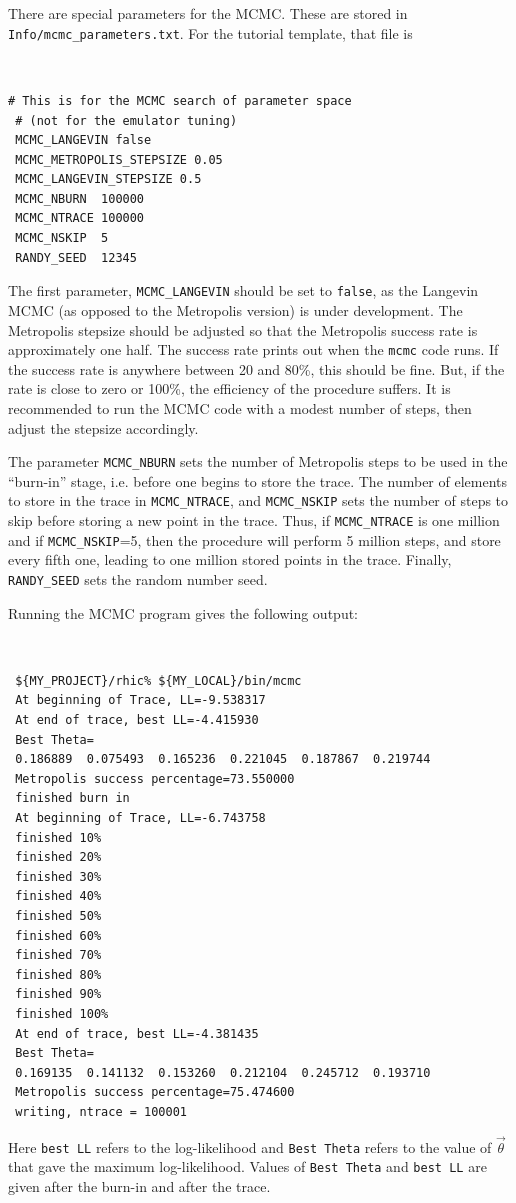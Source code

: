 \documentclass[UserManual.tex]{subfiles}
\begin{document}
There are special parameters for the MCMC. These are stored in {\tt Info/mcmc\_parameters.txt}. For the tutorial template, that file is
{\tt
\begin{verbatim}
# This is for the MCMC search of parameter space
 # (not for the emulator tuning)
 MCMC_LANGEVIN false
 MCMC_METROPOLIS_STEPSIZE 0.05
 MCMC_LANGEVIN_STEPSIZE 0.5
 MCMC_NBURN  100000
 MCMC_NTRACE 100000
 MCMC_NSKIP  5
 RANDY_SEED  12345
\end{verbatim}}
The first parameter, {\tt MCMC\_LANGEVIN} should be set to {\tt false}, as the Langevin MCMC (as opposed to the Metropolis version) is under development. The Metropolis stepsize should be adjusted so that the Metropolis success rate is approximately one half. The success rate prints out when the {\tt mcmc} code runs. If the success rate is anywhere between 20 and 80\%, this should be fine. But, if the rate is close to zero or 100\%, the efficiency of the procedure suffers. It is recommended to run the MCMC code with a modest number of steps, then adjust the stepsize accordingly.

The parameter {\tt MCMC\_NBURN} sets the number of Metropolis steps to be used in the ``burn-in'' stage, i.e. before one begins to store the trace. The number of elements to store in the trace in {\tt MCMC\_NTRACE}, and {\tt MCMC\_NSKIP} sets the number of steps to skip before storing a new point in the trace. Thus, if {\tt MCMC\_NTRACE} is one million and if {\tt MCMC\_NSKIP}=5, then the procedure will perform 5 million steps, and store every fifth one, leading to one million stored points in the trace. Finally, {\tt RANDY\_SEED} sets the random number seed. 

Running the MCMC program gives the following output:
{\tt
\begin{verbatim}
 ${MY_PROJECT}/rhic% ${MY_LOCAL}/bin/mcmc
 At beginning of Trace, LL=-9.538317
 At end of trace, best LL=-4.415930
 Best Theta=
 0.186889  0.075493  0.165236  0.221045  0.187867  0.219744
 Metropolis success percentage=73.550000
 finished burn in
 At beginning of Trace, LL=-6.743758
 finished 10%
 finished 20%
 finished 30%
 finished 40%
 finished 50%
 finished 60%
 finished 70%
 finished 80%
 finished 90%
 finished 100%
 At end of trace, best LL=-4.381435
 Best Theta=
 0.169135  0.141132  0.153260  0.212104  0.245712  0.193710
 Metropolis success percentage=75.474600
 writing, ntrace = 100001
\end{verbatim}}
Here {\tt best LL} refers to the log-likelihood and {\tt Best Theta} refers to the value of $\vec{\theta}$ that gave the maximum log-likelihood. Values of {\tt Best Theta} and {\tt best LL} are given after the burn-in and after the trace. 
\end{document}
